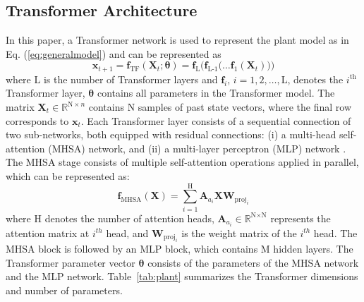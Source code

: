 \documentclass[letterpaper, 10 pt, conference]{ieeeconf}
\begin{document}

\subsection{Transformer Architecture}
In this paper, a Transformer network \cite{Vaswani2017} is used to represent the plant model as in Eq. (\ref{eq:generalmodel}) and can be represented as
\begin{equation}
\label{eqNNTF}
\textbf{x}_{t+1} = \textbf{f}_{\text{TF}} (\textbf{X}_{t};\bm{\theta}) =  \textbf{f}_{\text{L}}\Big(\textbf{f}_{{\text{L-1}}}\big(\dots \textbf{f}_{1}(\textbf{X}_{t})\big)\Big)
\end{equation}
where $\text{L}$ is the number of Transformer layers and $\textbf{f}_{i}$, $i = 1, 2, \dots, \text{L}$, denotes the $i^{\text{th}}$ Transformer layer, $\bm{\theta}$ contains all parameters in the Transformer model. The matrix $\textbf{X}_{t}\in \mathbb{R}^{\text{N}\times n}$ contains $\text{N}$ samples of past state vectors, where the final row corresponds to $\textbf{x}_t$. Each Transformer layer consists of a sequential connection of two sub-networks, both equipped with residual connections: (i) a multi-head self-attention (MHSA) network, and (ii) a multi-layer perceptron (MLP) network \cite{Vaswani2017}. The MHSA stage consists of multiple self-attention operations applied in parallel, which can be represented as:
\begin{equation}
\label{eqfMHSA}
\textbf{f}_{\text{MHSA}} (\textbf{X}) = \sum_{i=1}^{\text{H}}  \textbf{A}_{a_{i}} \textbf{X} \textbf{W}_{\mathrm{proj}_{i}}
\end{equation}
where $\text{H}$ denotes the number of attention heads, $\textbf{A}_{a_{i}} \in \mathbb{R}^{\text{N} \times \text{N}}$ represents the attention matrix at $i^{th}$ head, and $\textbf{W}_{\mathrm{proj}_i}$ is the weight matrix of the $i^{th}$ head. %
The MHSA block is followed by an MLP block, which contains $\mathrm{M}$ hidden layers. The Transformer parameter vector $\bm{\theta}$ consists of the parameters of the MHSA network and the MLP network.
Table~\ref{tab:plant} summarizes the Transformer dimensions and number of parameters.
\end{document}
